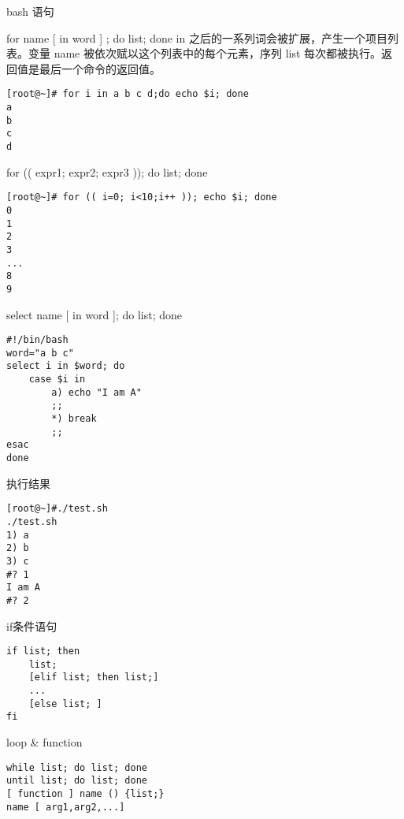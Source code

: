\begin{frame}{bash 语句}

\begin{block}{for name [ in word ] ; do list; done }
in 之后的一系列词会被扩展，产生一个项目列表。变量 name 被依次赋以这个列表中的每个元素，序列 list 每次都被执行。返回值是最后一个命令的返回值。
\begin{verbatim}
[root@~]# for i in a b c d;do echo $i; done
a
b
c
d
\end{verbatim}
\end{block}

\newpage

\begin{block}{for (( expr1; expr2; expr3 )); do list; done }
\begin{verbatim}
[root@~]# for (( i=0; i<10;i++ )); echo $i; done
0
1
2
3
...
8
9
\end{verbatim}
\end{block}

\newpage

\begin{block}{select name [ in word ]; do list; done}
\begin{verbatim}
#!/bin/bash
word="a b c"
select i in $word; do
	case $i in 
		a) echo "I am A"
		;;
		*) break
		;;
esac	
done
\end{verbatim}
\end{block}

\newpage

\begin{block}{执行结果}
\begin{verbatim}
[root@~]#./test.sh
./test.sh
1) a
2) b
3) c
#? 1
I am A
#? 2
\end{verbatim}
\end{block}

\newpage

\begin{block}{if条件语句}
\begin{verbatim}
if list; then
    list;
    [elif list; then list;]
    ...
    [else list; ]
fi
\end{verbatim}
\end{block}

\newpage

\begin{block}{loop \& function}
\begin{verbatim}
while list; do list; done
until list; do list; done
[ function ] name () {list;} 
name [ arg1,arg2,...]
\end{verbatim}
\end{block}
\end{frame}


